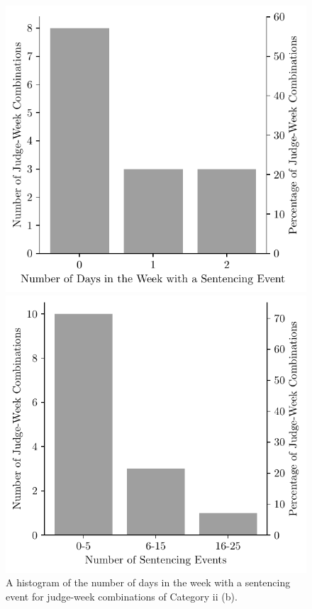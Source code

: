 \documentclass[11pt, oneside]{article}   	%
\theoremstyle{ModifiedStyle}
\begin{document}
			\begin{figure}[H]
				\centering
				\begin{minipage}{.45\textwidth}
					\centering
					\hspace*{-3mm}
					\includegraphics[scale=0.72]{Figures/Histogram_of_Number_of_Days_With_Sentences_Category_11}
					\hspace{4mm}
					\vspace{-6.0mm}
					\caption{A histogram of the number of days in the week with a sentencing event for judge-week combinations of Category ii (b).}
					\label{Figure_Histogram_of_Number_of_Days_With_Sentences_Category_11}
				\end{minipage}
				\hspace{5mm}
				\begin{minipage}{0.45\textwidth}
					\centering
					\hspace*{-3mm}
					\includegraphics[scale=0.72]{Figures/Histogram_of_Sentences_This_Week_Category_11}

\end{minipage}
\end{figure}
\end{document}
